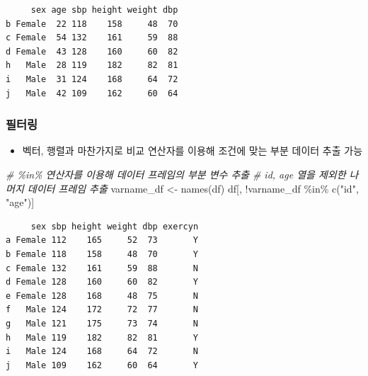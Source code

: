 \documentclass[
  11pt,
]{krantz}
\newenvironment{Shaded}{\begin{snugshade}}{\end{snugshade}}
\newcommand{\CommentTok}[1]{\textcolor[rgb]{0.37,0.37,0.37}{\textit{#1}}}
\newcommand{\DecValTok}[1]{\textcolor[rgb]{0.06,0.06,0.06}{#1}}
\newcommand{\FunctionTok}[1]{\textcolor[rgb]{0,0,0}{#1}}
\newcommand{\NormalTok}[1]{#1}
\newcommand{\OtherTok}[1]{\textcolor[rgb]{0.37,0.37,0.37}{#1}}
\newcommand{\SpecialCharTok}[1]{\textcolor[rgb]{0,0,0}{#1}}
\newcommand{\StringTok}[1]{\textcolor[rgb]{0.5,0.5,0.5}{#1}}
\providecommand{\tightlist}{%
  \setlength{\itemsep}{0pt}\setlength{\parskip}{0pt}}
\begin{document}
\begin{verbatim}
     sex age sbp height weight dbp
b Female  22 118    158     48  70
c Female  54 132    161     59  88
d Female  43 128    160     60  82
h   Male  28 119    182     82  81
i   Male  31 124    168     64  72
j   Male  42 109    162     60  64
\end{verbatim}

\normalsize

\hypertarget{data-frame-filtering}{%
\subsubsection*{필터링}\label{data-frame-filtering}}


\begin{itemize}
\tightlist
\item
  벡터, 행렬과 마찬가지로 비교 연산자를 이용해 조건에 맞는 부분 데이터 추출 가능
\end{itemize}

\footnotesize

\begin{Shaded}
\begin{Highlighting}[]
\CommentTok{\# \%in\% 연산자를 이용해 데이터 프레임의 부분 변수 추출}
\CommentTok{\# id, age 열을 제외한 나머지 데이터 프레임 추출}
\NormalTok{varname\_df }\OtherTok{\textless{}{-}} \FunctionTok{names}\NormalTok{(df)}
\NormalTok{df[, }\SpecialCharTok{!}\NormalTok{varname\_df }\SpecialCharTok{\%in\%} \FunctionTok{c}\NormalTok{(}\StringTok{"id"}\NormalTok{, }\StringTok{"age"}\NormalTok{)]}
\end{Highlighting}
\end{Shaded}

\begin{verbatim}
     sex sbp height weight dbp exercyn
a Female 112    165     52  73       Y
b Female 118    158     48  70       Y
c Female 132    161     59  88       N
d Female 128    160     60  82       Y
e Female 128    168     48  75       N
f   Male 124    172     72  77       N
g   Male 121    175     73  74       N
h   Male 119    182     82  81       Y
i   Male 124    168     64  72       N
j   Male 109    162     60  64       Y
\end{verbatim}

\begin{Shaded}
\end{Shaded}
\end{document}
